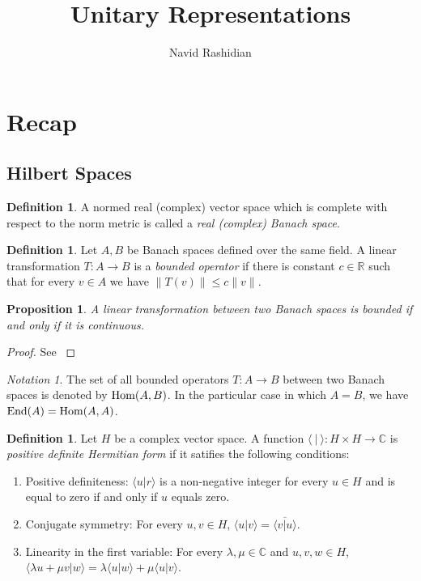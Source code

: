 \documentclass[12pt]{article}
\title{Unitary Representations}
\author{Navid Rashidian}
\date{}
\newtheorem{prop}[thm]{Proposition}
\theoremstyle{definition}
\newtheorem{dfn}[thm]{Definition}
\theoremstyle{remark}
\newtheorem{notation}[thm]{Notation}
\newcommand{\Comp}{\mathbb{C}}
\newcommand{\Real}{\mathbb{R}}
\newcommand{\Hom}[2]{\textup{Hom}(#1,#2)}
\newcommand{\End}[1]{\textup{End}(#1)}
\begin{document}
    \maketitle

    \section{Recap}

    \subsection{Hilbert Spaces}

    \begin{dfn}
        A normed real (complex) vector space which is complete with respect to the norm metric is called a \emph{real (complex) Banach space}.
    \end{dfn}

    \begin{dfn}
        Let $A,B$ be Banach spaces defined over the same field. A linear transformation $T\colon A\to B$ is a \emph{bounded operator} if there is constant $c\in\Real$ such that for every $v\in A$ we have $\|T(v)\|\leq c\|v\|$.
    \end{dfn}

    \begin{prop}
        A linear transformation between two Banach spaces is bounded if and only if it is continuous.
    \end{prop}

    \begin{proof}
        See \cite[Ch. II, Prop. 1.1]{Conway1985}
    \end{proof}

    \begin{notation}
        The set of all bounded operators $T\colon A\to B$ between two Banach spaces is denoted by $\Hom{A}{B}$. In the particular case in which $A=B$, we have $\End{A}=\Hom{A}{A}$.
    \end{notation}

    \begin{dfn}
        Let $H$ be a complex vector space. A function $\langle\ |\ \rangle\colon H\times H\to\Comp$ is \emph{positive definite Hermitian form} if it satifies the following conditions:
        \begin{enumerate}
            \item Positive definiteness: $\langle u|r\rangle$ is a non-negative integer for every $u\in H$ and is equal to zero if and only if $u$ equals zero.
            \item Conjugate symmetry: For every $u,v\in H$, $\langle u|v\rangle = \overline{\langle v|u \rangle}$.
            \item Linearity in the first variable: For every $\lambda,\mu\in\Comp$ and $u,v,w\in H$, $\langle\lambda u+\mu v|w\rangle=\lambda\langle u|w\rangle+\mu\langle u|v\rangle$.
        \end{enumerate}
    \end{dfn}
    
\end{document}
